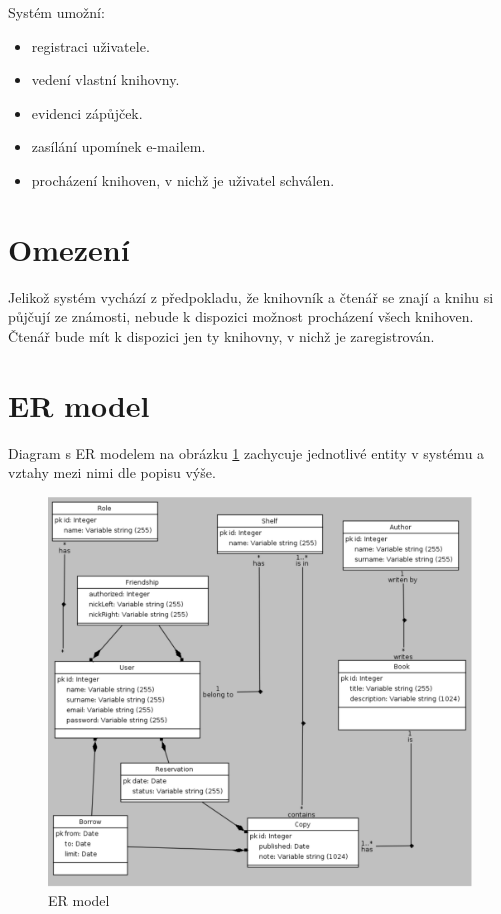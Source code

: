 \documentclass[12pt]{article}
\begin{document}
Systém umožní:

\begin{itemize}
	\item registraci uživatele.
	\item vedení vlastní knihovny.
	\item evidenci zápůjček.
	\item zasílání upomínek e-mailem.
	\item procházení knihoven, v nichž je uživatel schválen.
\end{itemize}

\section{Omezení}

Jelikož systém vychází z předpokladu, že knihovník a čtenář se znají a knihu si půjčují ze známosti, nebude k dispozici možnost procházení všech knihoven. Čtenář bude mít k dispozici jen ty knihovny, v nichž je zaregistrován.

\section{ER model}

Diagram s ER modelem na obrázku \ref{er} zachycuje jednotlivé entity v systému a vztahy mezi nimi dle popisu výše.

\begin{figure}
	\centering
	\includegraphics[scale=0.7]{model.eps}
	\caption{ER model}
	\label{er}
\end{figure}
\end{document}
